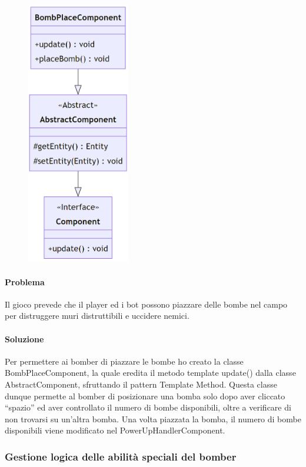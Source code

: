 \documentclass[a4paper,12pt]{report}
\begin{document}
\begin{figure}[H]
    \centering{}
    \includegraphics[width=0.4\textwidth]{img/UMLPlaceBomb.png}
    \caption{}
\end{figure}

\paragraph{Problema} Il gioco prevede che il player ed i bot possono piazzare delle bombe nel campo per distruggere muri distruttibili e uccidere nemici.

\paragraph{Soluzione} Per permettere ai bomber di piazzare le bombe ho creato la classe BombPlaceComponent, la quale eredita il metodo template update() dalla classe AbstractComponent, sfruttando il pattern Template Method. Questa classe dunque permette al bomber di posizionare una bomba solo dopo aver cliccato “spazio” ed aver controllato il numero di bombe disponibili, oltre a verificare di non trovarsi su un’altra bomba. Una volta piazzata la bomba, il numero di bombe disponibili viene modificato nel PowerUpHandlerComponent.


\subsubsection{Gestione logica delle abilità speciali del bomber}
\end{document}
